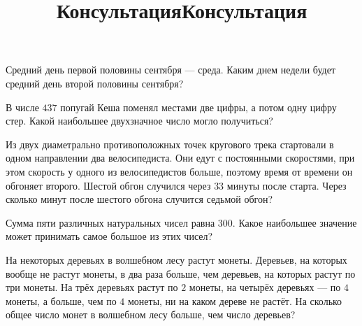 \newpage
\title{Консультация}
\begin{listofex}
	\item Средний день первой половины сентября --- среда. Каким днем недели будет средний день второй половины сентября?
	\item В числе \( 437 \) попугай Кеша поменял местами две цифры, а потом одну цифру стер. Какой наибольшее двухзначное число могло получиться?
	\item Из двух диаметрально противоположных точек кругового трека стартовали в одном направлении два велосипедиста. Они едут с постоянными скоростями, при этом скорость у одного из велосипедистов больше, поэтому время от времени он обгоняет второго. Шестой обгон случился через \( 33 \) минуты после старта. Через сколько минут после шестого обгона случится седьмой обгон?
	\item Сумма пяти различных натуральных чисел равна \( 300 \). Какое наибольшее значение может принимать самое большое из этих чисел?
	\item На некоторых деревьях в волшебном лесу растут монеты. Деревьев, на которых вообще не растут монеты, в два раза больше, чем деревьев, на которых растут по
	три монеты. На трёх деревьях растут по \( 2 \) монеты, на четырёх деревьях — по \( 4 \) монеты, а
	больше, чем по \( 4 \) монеты, ни на каком дереве не растёт. На сколько общее число монет в
	волшебном лесу больше, чем число деревьев?
\end{listofex}
\newpage
\title{Консультация}
